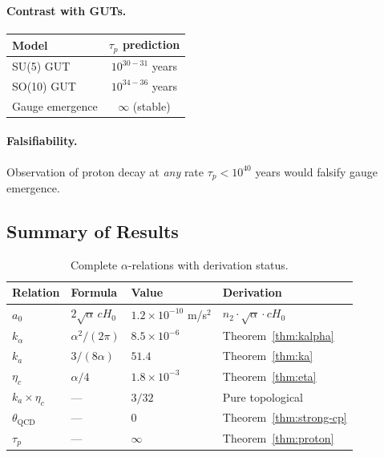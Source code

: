 \paragraph{Contrast with GUTs.}
\begin{center}
\begin{tabular}{lc}
\toprule
Model & $\tau_p$ prediction \\
\midrule
SU(5) GUT & $10^{30-31}$ years \\
SO(10) GUT & $10^{34-36}$ years \\
Gauge emergence & $\infty$ (stable) \\
\bottomrule
\end{tabular}
\end{center}

\paragraph{Falsifiability.}
Observation of proton decay at \textit{any} rate $\tau_p < 10^{40}$ years would falsify gauge emergence.

\subsection{Summary of Results}\label{app:derivation-summary}

\begin{table}[h]
\centering
\caption{Complete $\alpha$-relations with derivation status.}\label{tab:alpha-complete}
\renewcommand{\arraystretch}{1.2}
\begin{tabular}{llll}
\toprule
Relation & Formula & Value & Derivation \\
\midrule
$a_0$ & $2\sqrt{\alpha}\,cH_0$ & $1.2 \times 10^{-10}$ m/s$^2$ & $n_2 \cdot \sqrt{\alpha} \cdot cH_0$ \\
$k_\alpha$ & $\alpha^2/(2\pi)$ & $8.5 \times 10^{-6}$ & Theorem~\ref{thm:kalpha} \\
$k_a$ & $3/(8\alpha)$ & $51.4$ & Theorem~\ref{thm:ka} \\
$\eta_c$ & $\alpha/4$ & $1.8 \times 10^{-3}$ & Theorem~\ref{thm:eta} \\
\midrule
$k_a \times \eta_c$ & --- & $3/32$ & Pure topological \\
$\theta_{\text{QCD}}$ & --- & $0$ & Theorem~\ref{thm:strong-cp} \\
$\tau_p$ & --- & $\infty$ & Theorem~\ref{thm:proton} \\
\bottomrule
\end{tabular}
\end{table}

